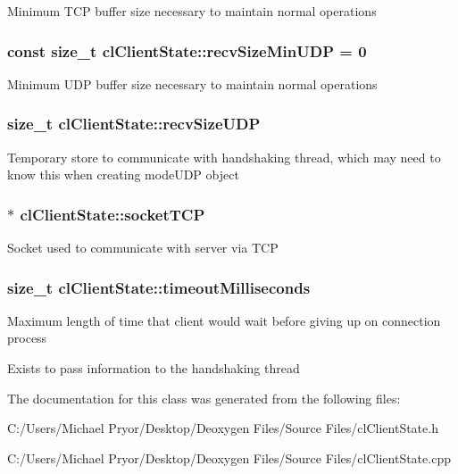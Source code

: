 \label{classcl_client_state_ac4ab48651bcfd9249d396771f9bb7f58}
Minimum TCP buffer size necessary to maintain normal operations \hypertarget{classcl_client_state_a0941e83ecbd7a734a83e9759e622c7a3}{
\subsubsection[{recvSizeMinUDP}]{\setlength{\rightskip}{0pt plus 5cm}const size\_\-t {\bf clClientState::recvSizeMinUDP} = 0}}
\label{classcl_client_state_a0941e83ecbd7a734a83e9759e622c7a3}
Minimum UDP buffer size necessary to maintain normal operations \hypertarget{classcl_client_state_a3aaf9947d4f362c07cacc6f5ea89ba82}{
\subsubsection[{recvSizeUDP}]{\setlength{\rightskip}{0pt plus 5cm}size\_\-t {\bf clClientState::recvSizeUDP}}}
\label{classcl_client_state_a3aaf9947d4f362c07cacc6f5ea89ba82}
Temporary store to communicate with handshaking thread, which may need to know this when creating modeUDP object \hypertarget{classcl_client_state_ac58716d4f5c67f88577540d0272f0804}{
\subsubsection[{socketTCP}]{$\ast$ {\bf clClientState::socketTCP}}}
\label{classcl_client_state_ac58716d4f5c67f88577540d0272f0804}
Socket used to communicate with server via TCP \hypertarget{classcl_client_state_aad6e8fb3e4c918cdd7596a1e5b7e8e5b}{
\subsubsection[{timeoutMilliseconds}]{\setlength{\rightskip}{0pt plus 5cm}size\_\-t {\bf clClientState::timeoutMilliseconds}}}
\label{classcl_client_state_aad6e8fb3e4c918cdd7596a1e5b7e8e5b}
Maximum length of time that client would wait before giving up on connection process \par
 Exists to pass information to the handshaking thread 

The documentation for this class was generated from the following files:\begin{DoxyCompactItemize}
\item 
C:/Users/Michael Pryor/Desktop/Deoxygen Files/Source Files/clClientState.h\item 
C:/Users/Michael Pryor/Desktop/Deoxygen Files/Source Files/clClientState.cpp\end{DoxyCompactItemize}
